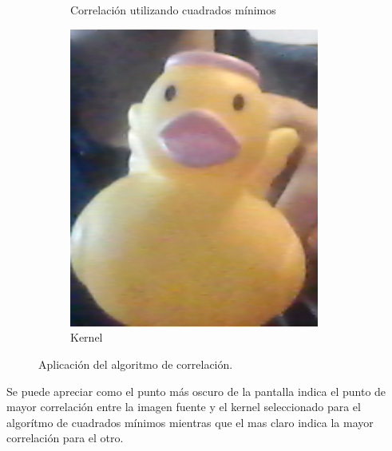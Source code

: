 \begin{figure}[H]
\begin{subfigure}{.4\textwidth}
		\caption{Correlación utilizando cuadrados mínimos}
		\label{fig:sqdiff}
	\end{subfigure}
	\begin{subfigure}{.1\textwidth}
		\centering
		\includegraphics[width=0.9\textwidth]{Imagenes/kernel.png}
		\caption{Kernel}
		\label{fig:kernel}
	\end{subfigure}
	\caption{Aplicación del algoritmo de correlación.}
	\label{fig:corrtest}
\end{figure}
Se puede apreciar como el punto más oscuro de la pantalla indica el punto de mayor correlación entre la imagen fuente y el kernel seleccionado para el algorítmo de cuadrados mínimos mientras que el mas claro indica la mayor correlación para el otro. 
